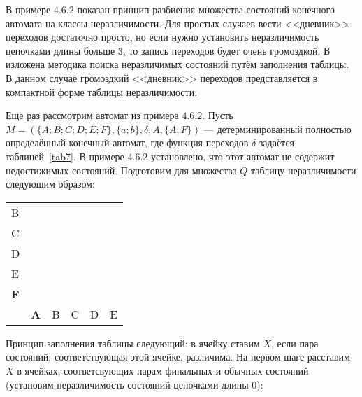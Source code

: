 В примере $4.6.2$ показан принцип разбиения множества состояний конечного автомата на классы неразличимости. Для простых случаев вести <<дневник>> переходов достаточно просто, но если нужно установить неразличимость цепочками длины больше $3$, то запись переходов будет очень громоздкой. В \cite {Hop} изложена методика поиска неразличимых состояний путём заполнения таблицы. В данном случае громоздкий <<дневник>> переходов представляется в компактной форме таблицы неразличимости.
\begin{myexample}
Еще раз рассмотрим автомат из примера $4.6.2$. Пусть $M=(\{A;B;C;D;E;F\},\{a;b\},\delta,A,\{A;F\})$ --- детерминированный полностью определённый конечный автомат, где функция переходов $\delta$ задаётся таблицей~\ref{tab7}. В примере $4.6.2$ установлено, что этот автомат не содержит недостижимых состояний. Подготовим для множества $Q$ таблицу неразличимости следующим образом:
\\
 \begin{center}
\begin{tabular}{llllll}
\cline{2-2}
\multicolumn{1}{l|}{B} & \multicolumn{1}{l|}{} &                       &                       &                       &                       \\ \cline{2-3}
\multicolumn{1}{l|}{C} & \multicolumn{1}{l|}{} & \multicolumn{1}{l|}{} &                       &                       &                       \\ \cline{2-4}
\multicolumn{1}{l|}{D} & \multicolumn{1}{l|}{} & \multicolumn{1}{l|}{} & \multicolumn{1}{l|}{} &                       &                       \\ \cline{2-5}
\multicolumn{1}{l|}{E} & \multicolumn{1}{l|}{} & \multicolumn{1}{l|}{} & \multicolumn{1}{l|}{} & \multicolumn{1}{l|}{} &                       \\ \cline{2-6}
\multicolumn{1}{l|}{\textbf{F}} & \multicolumn{1}{l|}{} & \multicolumn{1}{l|}{} & \multicolumn{1}{l|}{} & \multicolumn{1}{l|}{} & \multicolumn{1}{l|}{} \\ \cline{2-6}
                       & \textbf{A}                     & B                     & C                     & D                     & E
\end{tabular}
 \end{center}
Принцип заполнения таблицы следующий: в ячейку ставим $X$, если пара состояний, соответствующая этой ячейке, различима. На первом шаге расставим $X$ в ячейках, соответсвующих парам финальных и обычных состояний (установим неразличимость состояний цепочками длины $0$):

\end{myexample}
